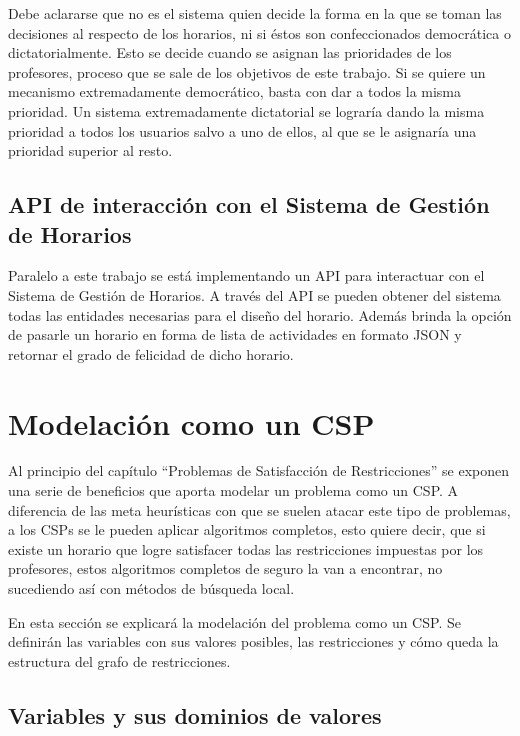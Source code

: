 Debe aclararse que no es el sistema quien decide la forma en la que se toman las decisiones al respecto de los horarios, ni si éstos son confeccionados democrática o dictatorialmente. Esto se decide cuando se asignan las prioridades de los profesores, proceso que se sale de los objetivos de este trabajo. Si se quiere un mecanismo extremadamente democrático, basta con dar a todos la misma prioridad. Un sistema extremadamente dictatorial se lograría dando la misma prioridad a todos los usuarios salvo a uno de ellos, al que se le asignaría una prioridad superior al resto.

\subsection{API de interacci\'on con el Sistema de Gesti\'on de Horarios}

Paralelo a este trabajo se est\'a implementando un API para interactuar con el Sistema de Gesti\'on de Horarios. A trav\'es del API se pueden obtener del sistema todas las entidades necesarias para el diseño del horario. Adem\'as brinda la opci\'on de pasarle un horario en forma de lista de actividades en formato JSON y retornar el grado de felicidad de dicho horario.

\section{Modelaci\'on como un CSP}

Al principio del cap\'itulo ``Problemas de Satisfacción de Restricciones'' se exponen una serie de beneficios que aporta modelar un problema como un CSP. A diferencia de las meta heur\'isticas con que se suelen atacar este tipo de problemas, a los CSPs se le pueden aplicar algoritmos completos, esto quiere decir, que si existe un horario que logre satisfacer todas las restricciones impuestas por los profesores, estos algoritmos completos de seguro la van a encontrar, no sucediendo as\'i con m\'etodos de b\'usqueda local.

En esta secci\'on se explicar\'a la modelaci\'on del problema como un CSP. Se definir\'an las variables con sus valores posibles, las restricciones y c\'omo queda la estructura del grafo de restricciones.

\subsection{Variables y sus dominios de valores}

